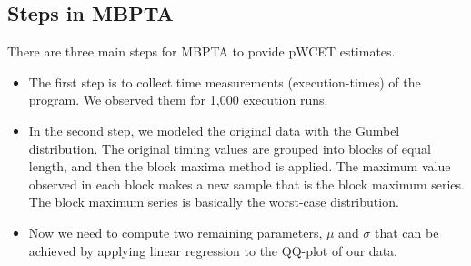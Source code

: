 \subsection{Steps in MBPTA}
There are three main steps for MBPTA to povide pWCET estimates.

\begin{itemize}
\item{The first step is to collect time measurements (execution-times) of the program. We observed them for 1,000 execution runs}.

\item{In the second step, we modeled the original data with the Gumbel distribution. The original timing values are grouped into blocks of equal length, and then the block maxima method is applied. The maximum value observed in each block makes a new sample that is the block maximum series. The block maximum series is basically the worst-case distribution}.

\item{Now we need to compute two remaining parameters, $\mu$ and $\sigma$ that can be achieved by applying  linear regression to the QQ-plot of our data}.
\end{itemize}




